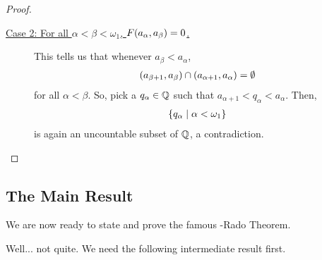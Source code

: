 \begin{proof}
\begin{description}
        \item[\underline{Case 2: For all $\alpha < \beta < \omega_1$, $F\!\left( a_{\alpha}, a_{\beta} \right) = 0$.}]
        This tells us that whenever $a_{\beta} < a_{\alpha}$,
        \begin{align*}
            \left( a_{\beta + 1}, a_{\beta} \right) \cap \left( a_{\alpha + 1}, a_{\alpha} \right) = \emptyset
        \end{align*}
        for all $\alpha < \beta$. So, pick a $q_{\alpha} \in \mathbb{Q}$ such that $a_{\alpha + 1} < q_{\alpha} < a_{\alpha}$. Then,
        \begin{align*}
            \left\{ q_{\alpha} \; \middle\vert \; \alpha < \omega_1 \right\}
        \end{align*}
        is again an uncountable subset of $\mathbb{Q}$, a contradiction.
    \end{description}
\end{proof}

\subsection{The Main Result}

We are now ready to state and prove the famous \Erdos-Rado Theorem.


Well... not quite. We need the following intermediate result first.


